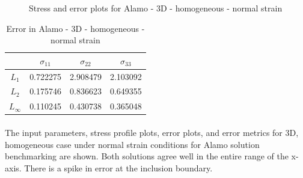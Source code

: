 \documentclass[12pt, a4paper]{report}
\begin{document}
\begin{figure}[htbp]
  \centering
  \hfill
  \caption{Stress and error plots for Alamo - 3D - homogeneous - normal strain}
\end{figure}

\begin{table}[H]
    \centering
    \begin{tabular}{|c|c|c|c|}
        \hline
        &\textbf{$\sigma_{11}$} &  \textbf{$\sigma_{22}$} & \textbf{$\sigma_{33}$}\\
        \hline
        $L_1$ & 0.722275 & 2.908479 & 2.103092 \\
        \hline
        $L_2$ & 0.175746 & 0.836623 & 0.649355 \\
        \hline 
        $L_\infty$ & 0.110245 & 0.430738 & 0.365048 \\
        \hline
    \end{tabular}
    \caption{Error in Alamo - 3D - homogeneous - normal strain}
\end{table}

\paragraph{}
The input parameters, stress profile plots, error plots, and error metrics for 3D, homogeneous case under normal strain conditions for Alamo solution benchmarking are shown. Both solutions agree well in the entire range of the x-axis. There is a spike in error at the inclusion boundary.
\end{document}

